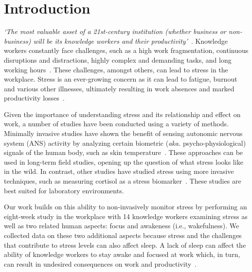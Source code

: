 \section{Introduction}
\textit{`The most valuable asset of a 21st-century institution (whether 
business or non-business) will be its knowledge workers and their 
productivity'}~\cite{drucker1999knowledge}. Knowledge workers constantly face 
challenges, such as a high work fragmentation, continuous disruptions and 
distractions, highly complex and demanding tasks, and long working 
hours~\cite{gonzalez2004constant,mark2008cost,czerwinski04diary}. 
These challenges, amongst others, can lead to stress in the workplace.
Stress is an ever-growing concern as it can lead to
fatigue, burnout and various other illnesses, ultimately resulting in 
work absences and marked productivity 
losses~\cite{hockey1997stress,setz2010stress,wrs2010}.

Given the importance of understanding stress and its relationship and
effect on work, a number of studies have been conducted using a
variety of methods. Minimally invasive studies have shown the benefit of sensing
autonomic nervous system (ANS) activity by analyzing certain biometric (\textit{aka.} psycho-physiological) signals
of the human body, such as skin temperature~\cite{kataoka00}.
These approaches can be used in long-term field
studies, opening up the question of what stress
looks like in the wild. 
In contrast, other studies have studied stress using more invasive
techniques, such as measuring cortisol as a stress biomarker~\cite{piazza10}. These studies are best suited
for laboratory environments.

Our work builds on this ability to non-invasively monitor stress by performing an eight-week study in the workplace with 14 knowledge workers examining stress as well as two related human aspects: focus and awakeness (i.e., wakefulness). We collected data on these two additional aspects because stress and the challenges that contribute to stress levels can also affect sleep. A lack of sleep can affect
the ability of knowledge workers to stay awake and focused at work which, in turn, can result in undesired consequences on work and productivity~\cite{connor02,cohen1997measuring,mark2014bored}.


